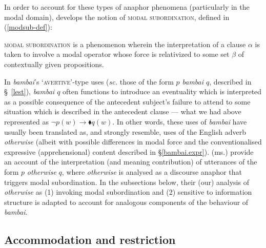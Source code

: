 In order to account for these types of anaphor phenomena (particularly in the modal domain), \citet{Roberts1989,Roberts1990,Roberts2020} develops the notion of \textsc{modal subordination}, defined in (\ref{modsub-def}):

\pex\label{modsub-def}\textsc{modal subordination} is a phenomenon wherein the interpretation of a clause $ \alpha $ is taken to involve a modal operator whose force is relativized to some set $ \beta $ of contextually given propositions.\hfill\citep[718]{Roberts1989}


\xe







In \textit{bambai}'s `\textsc{avertive'}-type uses (\textit{sc.} those of the form \textit{$ p $ bambai $ q $}, described in \S~\ref{lest}), \textit{bambai $ q $} often functions to introduce an eventuality which is interpreted as a possible consequence of the antecedent subject's failure to attend to some situation which is described in the antecedent clause --- what we had above represented as $ \neg p(w)\to\blacklozenge q(w)$. In other words, these uses of \textit{bambai} have usually been translated as, and strongly resemble, uses of the English adverb \textit{otherwise} (albeit with possible differences in modal force and the conventionalised expressive (apprehensional) content described in \S \ref{bambai.expr}). \citet{PhilKotek} (ms.) provide an account of the interpretation (and meaning contribution) of utterances of the form $ p  $ \textit{otherwise} $ q $, where \textit{otherwise} is analysed as a discourse anaphor that triggers modal subordination. In the subsections below, their (our) analysis of \textit{otherwise} as (1) invoking modal subordination and (2) sensitive to information structure is adapted to account for analogous components of the behaviour of \textit{bambai}.


\subsection{Accommodation and restriction}\label{modsub}

